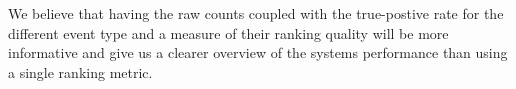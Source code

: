 We believe that having the raw counts coupled with the true-postive rate for the different event type and a measure of their
ranking quality will be more informative and give us a clearer overview of the systems performance than using a single ranking
metric.

%
%
%
